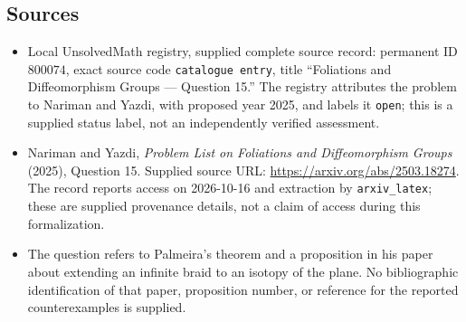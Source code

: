 \documentclass[11pt]{article}
\begin{document}
\subsection{Sources}
\begin{itemize}
\item Local UnsolvedMath registry, supplied complete source record: permanent ID \(800074\), exact source code \texttt{catalogue entry}, title ``Foliations and Diffeomorphism Groups --- Question 15.'' The registry attributes the problem to Nariman and Yazdi, with proposed year 2025, and labels it \texttt{open}; this is a supplied status label, not an independently verified assessment.
\item Nariman and Yazdi, \emph{Problem List on Foliations and Diffeomorphism Groups} (2025), Question 15. Supplied source URL: \url{https://arxiv.org/abs/2503.18274}. The record reports access on 2026-10-16 and extraction by \texttt{arxiv\_latex}; these are supplied provenance details, not a claim of access during this formalization.
\item The question refers to Palmeira's theorem and a proposition in his paper about extending an infinite braid to an isotopy of the plane. No bibliographic identification of that paper, proposition number, or reference for the reported counterexamples is supplied.
\end{itemize}
\end{document}
